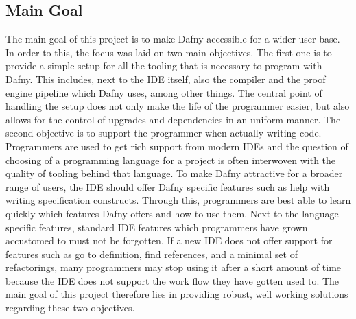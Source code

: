 \subsection{Main Goal}\label{mainGoal}
The main goal of this project is to make Dafny accessible for a wider user base. In order to this, the focus was laid on two main objectives. \newline
The first one is to provide a simple setup for all the tooling that is necessary to program with Dafny. This includes, next to the IDE itself, also the compiler and the proof engine pipeline which Dafny uses, among other things. The central point of handling the setup does not only make the life of the programmer easier, but also allows for the control of upgrades and dependencies in an uniform manner. \newline
The second objective is to support the programmer when actually writing code. Programmers are used to get rich support from modern IDEs and the question of choosing of a programming language for a project is often interwoven with the quality of tooling behind that language. To make Dafny attractive for a broader range of users, the IDE should offer Dafny specific features such as help with writing specification constructs. Through this, programmers are best able to learn quickly which features Dafny offers and how to use them. Next to the language specific features, standard IDE features which programmers have grown accustomed to must not be forgotten. If a new IDE does not offer support for features such as go to definition, find references, and a minimal set of refactorings, many programmers may stop using it after a short amount of time because the IDE does not support the work flow they have gotten used to. \newline
The main goal of this project therefore lies in providing robust, well working solutions regarding these two objectives. \newline